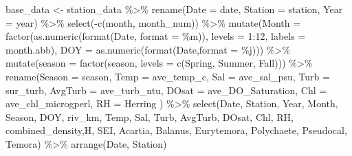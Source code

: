 \documentclass[
]{article}
\newenvironment{Shaded}{\begin{snugshade}}{\end{snugshade}}
\newcommand{\AttributeTok}[1]{\textcolor[rgb]{0.77,0.63,0.00}{#1}}
\newcommand{\DecValTok}[1]{\textcolor[rgb]{0.00,0.00,0.81}{#1}}
\newcommand{\FunctionTok}[1]{\textcolor[rgb]{0.00,0.00,0.00}{#1}}
\newcommand{\NormalTok}[1]{#1}
\newcommand{\OtherTok}[1]{\textcolor[rgb]{0.56,0.35,0.01}{#1}}
\newcommand{\SpecialCharTok}[1]{\textcolor[rgb]{0.00,0.00,0.00}{#1}}
\newcommand{\StringTok}[1]{\textcolor[rgb]{0.31,0.60,0.02}{#1}}
\begin{document}
\begin{Shaded}
\begin{Highlighting}[]
\NormalTok{base\_data }\OtherTok{\textless{}{-}}\NormalTok{ station\_data }\SpecialCharTok{\%\textgreater{}\%}
  \FunctionTok{rename}\NormalTok{(}\AttributeTok{Date =}\NormalTok{ date, }
         \AttributeTok{Station =}\NormalTok{ station,}
         \AttributeTok{Year =}\NormalTok{ year) }\SpecialCharTok{\%\textgreater{}\%}
  \FunctionTok{select}\NormalTok{(}\SpecialCharTok{{-}}\FunctionTok{c}\NormalTok{(month, month\_num)) }\SpecialCharTok{\%\textgreater{}\%}
  \FunctionTok{mutate}\NormalTok{(}\AttributeTok{Month =} \FunctionTok{factor}\NormalTok{(}\FunctionTok{as.numeric}\NormalTok{(}\FunctionTok{format}\NormalTok{(Date, }\AttributeTok{format =} \StringTok{\textquotesingle{}\%m\textquotesingle{}}\NormalTok{)),}
                                                \AttributeTok{levels =} \DecValTok{1}\SpecialCharTok{:}\DecValTok{12}\NormalTok{, }
                                                \AttributeTok{labels =}\NormalTok{ month.abb),}
         \AttributeTok{DOY =} \FunctionTok{as.numeric}\NormalTok{(}\FunctionTok{format}\NormalTok{(Date,}\AttributeTok{format =} \StringTok{\textquotesingle{}\%j\textquotesingle{}}\NormalTok{))) }\SpecialCharTok{\%\textgreater{}\%}
  \FunctionTok{mutate}\NormalTok{(}\AttributeTok{season =} \FunctionTok{factor}\NormalTok{(season, }\AttributeTok{levels =} \FunctionTok{c}\NormalTok{(}\StringTok{\textquotesingle{}Spring\textquotesingle{}}\NormalTok{, }\StringTok{\textquotesingle{}Summer\textquotesingle{}}\NormalTok{, }\StringTok{\textquotesingle{}Fall\textquotesingle{}}\NormalTok{))) }\SpecialCharTok{\%\textgreater{}\%}
  \FunctionTok{rename}\NormalTok{(}\AttributeTok{Season =}\NormalTok{ season,}
         \AttributeTok{Temp =}\NormalTok{ ave\_temp\_c,}
         \AttributeTok{Sal =}\NormalTok{ ave\_sal\_psu,}
         \AttributeTok{Turb =}\NormalTok{ sur\_turb,}
         \AttributeTok{AvgTurb =}\NormalTok{ ave\_turb\_ntu,}
         \AttributeTok{DOsat =}\NormalTok{ ave\_DO\_Saturation,}
         \AttributeTok{Chl =}\NormalTok{ ave\_chl\_microgperl,}
         \AttributeTok{RH =}\NormalTok{ Herring}
\NormalTok{         ) }\SpecialCharTok{\%\textgreater{}\%}
  \FunctionTok{select}\NormalTok{(Date, Station, Year, Month, Season, DOY, riv\_km, Temp, Sal, Turb, AvgTurb, }
\NormalTok{         DOsat, Chl, RH, }
\NormalTok{         combined\_density,H, SEI,}
\NormalTok{         Acartia, Balanus, Eurytemora, Polychaete, Pseudocal, Temora) }\SpecialCharTok{\%\textgreater{}\%}
  \FunctionTok{arrange}\NormalTok{(Date, Station)}

\end{Highlighting}
\end{Shaded}
\end{document}
